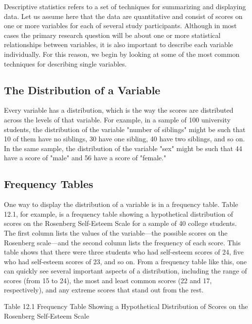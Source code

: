 Descriptive statistics refers to a set of techniques for summarizing and displaying data. Let us assume here that the data are quantitative and consist of scores on one or more variables for each of several study participants. Although in most cases the primary research question will be about one or more statistical relationships between variables, it is also important to describe each variable individually. For this reason, we begin by looking at some of the most common techniques for describing single variables.




\subsection{The Distribution of a Variable}



Every variable has a distribution, which is the way the scores are distributed across the levels of that variable. For example, in a sample of 100 university students, the distribution of the variable "number of siblings" might be such that 10 of them have no siblings, 30 have one sibling, 40 have two siblings, and so on. In the same sample, the distribution of the variable "sex" might be such that 44 have a score of "male" and 56 have a score of "female."

\subsection{Frequency Tables}

One way to display the distribution of a variable is in a frequency table. Table 12.1, for example, is a frequency table showing a hypothetical distribution of scores on the Rosenberg Self-Esteem Scale for a sample of 40 college students. The first column lists the values of the variable---the possible scores on the Rosenberg scale---and the second column lists the frequency of each score. This table shows that there were three students who had self-esteem scores of 24, five who had self-esteem scores of 23, and so on. From a frequency table like this, one can quickly see several important aspects of a distribution, including the range of scores (from 15 to 24), the most and least common scores (22 and 17, respectively), and any extreme scores that stand out from the rest.



Table 12.1 Frequency Table Showing a Hypothetical Distribution of Scores on the Rosenberg Self-Esteem Scale


